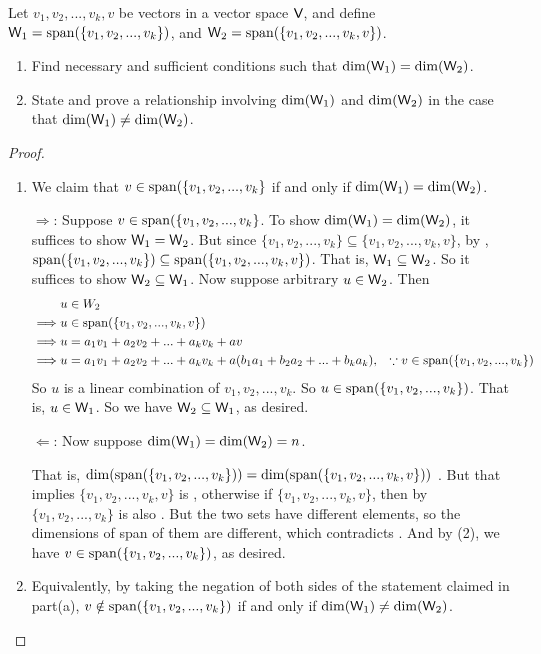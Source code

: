 \begin{exercise} \label{exercise 1.6.23}
\sloppy Let \(v_1, v_2, ..., v_k, v\) be vectors in a vector space \(\textsf{V}\), and define \(\textsf{W}_1 = \operatorname{span}(\{v_1, v_2, ..., v_k\})\), and \(\textsf{W}_2 = \operatorname{span}(\{ v_1, v_2, ..., v_k, v \})\).
\begin{enumerate}
\item Find necessary and sufficient conditions  such that \(\dim(\textsf{W}_1) = \dim(\textsf{W}_2)\).
\item State and prove a relationship involving \(\dim(\textsf{W}_1)\) and \(\dim(\textsf{W}_2)\) in the case that \(\dim(\textsf{W}_1) \ne \dim(\textsf{W}_2)\).
\end{enumerate}
\end{exercise}

\begin{proof}\ 

\begin{enumerate}
\item We claim that \(v \in \operatorname{span}(\{ v_1, v_2, ..., v_k \}\) if and only if \(\dim(\textsf{W}_1) = \dim(\textsf{W}_2)\).

\(\Longrightarrow\): Suppose \(v \in \operatorname{span}(\{ v_1, v_2, ..., v_k \}\).
To show \(\dim(\textsf{W}_1) = \dim(\textsf{W}_2)\), it suffices to show \(\textsf{W}_1 = \textsf{W}_2\).
But since \(\{ v_1, v_2, ..., v_k \} \subseteq \{ v_1, v_2, ..., v_k, v \}\), by , \(\operatorname{span}(\{ v_1, v_2, ..., v_k \}) \subseteq \operatorname{span}(\{ v_1, v_2, ..., v_k, v \})\).
That is, \(\textsf{W}_1 \subseteq \textsf{W}_2\).
So it suffices to show \(\textsf{W}_2 \subseteq \textsf{W}_1\).
Now suppose arbitrary \(u \in \textsf{W}_2\).
Then
\begin{align*}
             & u \in W_2 \\
    \implies & u \in \operatorname{span}(\{ v_1, v_2, ..., v_k, v \}) \\
    \implies & u = a_1 v_1 + a_2 v_2 + ... + a_k v_k + a v \\
    \implies & u = a_1 v_1 + a_2 v_2 + ... + a_k v_k + a (b_1 a_1 + b_2 a_2 + ... + b_k a_k), & \text{\(\because v \in \operatorname{span}(\{ v_1, v_2, ..., v_k \})\)}
\end{align*}
So \(u\) is a linear combination of \(v_1, v_2, ..., v_k\).
So \(u \in \operatorname{span}(\{ v_1, v_2, ..., v_k \})\).
That is, \(u \in \textsf{W}_1\).
So we have \(\textsf{W}_2 \subseteq \textsf{W}_1\), as desired.

\(\Longleftarrow\): Now suppose \(\dim(\textsf{W}_1) = \dim(\textsf{W}_2) = n\).

That is, \(\dim(\operatorname{span}(\{ v_1, v_2, ..., v_k \})) = \dim(\operatorname{span}(\{ v_1, v_2, ..., v_k, v \}))\) .
But that implies \(\{ v_1, v_2, ..., v_k, v \}\) is \LDP{}, otherwise if \(\{ v_1, v_2, ..., v_k, v \}\), then by  \(\{ v_1, v_2, ..., v_k \}\) is also \LID{}.
But the two sets have different elements, so the dimensions of span of them are different, which contradicts .
And by (2), we have \(v \in \operatorname{span}(\{ v_1, v_2, ..., v_k \})\), as desired.

\item Equivalently, by taking the negation of both sides of the statement claimed in part(a), \(v \notin \operatorname{span}(\{ v_1, v_2, ..., v_k \})\) if and only if \(\dim(\textsf{W}_1) \ne \dim(\textsf{W}_2)\).
\end{enumerate}
\end{proof}

